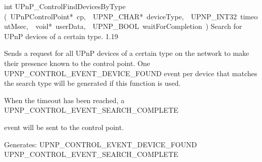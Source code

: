 \documentclass{article}
\begin{document}
\begin{cxxentry}
\begin{cxxfunction}
\begin{cxxdoc}
\end{cxxdoc}
\end{cxxfunction}
\begin{cxxfunction}
{int}
        {UPnP\_ControlFindDevicesByType}
        {(\ UPnPControlPoint*\ cp,\ \ UPNP\_CHAR*\ deviceType,\ \ UPNP\_INT32\ timeoutMsec,\ \ void*\ userData,\ \ UPNP\_BOOL\ waitForCompletion\ )}
        {Search for UPnP devices of a certain type. }
        {1.19}
\begin{cxxdoc}

Sends a request for all UPnP devices of a certain type on the network
to make their presence known to the control point.  One
UPNP\_CONTROL\_EVENT\_DEVICE\_FOUND event per device that matches the
search type will be generated if this function is used.

When the timeout has been reached, a UPNP\_CONTROL\_EVENT\_SEARCH\_COMPLETE

event will be sent to the control point.

Generates:
UPNP\_CONTROL\_EVENT\_DEVICE\_FOUND
UPNP\_CONTROL\_EVENT\_SEARCH\_COMPLETE



\end{cxxdoc}
\end{cxxfunction}
\end{cxxentry}
\end{document}
